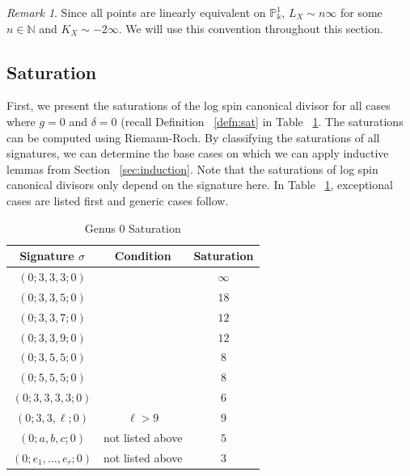 \documentclass{amsart}
\theoremstyle{plain}
\theoremstyle{definition}
\theoremstyle{remark}
\newtheorem{rem}[thm]{Remark}
\numberwithin{equation}{section}
\newcommand\ssec{\subsection}
\newcommand\BN{{\mathbb N}}
\newcommand\BP{{\mathbb P}}
\newcommand\Bk{{\Bbbk}}
\newcommand{\halfcan}{L}
\begin{document}
\begin{rem}
Since all points are linearly equivalent on $\BP^1_\Bk$, 
$\halfcan_X \sim n \infty$ for some $n \in \BN$ and
$K_X \sim -2 \infty$. We will use this convention
throughout this section.
\end{rem}

\ssec{Saturation}
\label{ssec:g-0-saturation}
First, we present the saturations of the log spin canonical divisor
for all cases where $g = 0$ and $\delta = 0$ (recall Definition
~\ref{defn:sat} in Table ~\ref{table:g-0-sat}. The saturations can
be computed using Riemann-Roch. By classifying the saturations of
all signatures, we can determine the base cases on which we can
apply inductive lemmas from Section ~\ref{sec:induction}. Note that
the saturations of log spin canonical divisors only depend on the
signature here. In Table ~\ref{table:g-0-sat}, exceptional cases
are listed first and generic cases follow.

\begin{table}
\begin{tabular}
	{| c | c || c |}
	\hline
	Signature $\sigma$ & Condition & Saturation \\
	\hline
	\hline

	$(0; 3, 3, 3; 0)$ & & $\infty$ \\	\hline

	$(0; 3, 3, 5; 0)$ & & $18$ \\	\hline
	
	$(0; 3, 3, 7; 0)$ & & $12$ \\	\hline
	
	$(0; 3, 3, 9; 0)$ & & $12$ \\	\hline
	
	$(0; 3, 5, 5; 0)$ & & $8$ \\	\hline
	
	$(0; 5, 5, 5; 0)$ & & $8$ \\	\hline
	
	$(0; 3, 3, 3, 3; 0)$ & & $6$ \\	\hline
	
	\hline
	\hline
	
	$(0; 3, 3, \ell; 0)$ & $\ell > 9$ & $9$ \\	\hline
	
	$(0; a, b, c; 0)$ & not listed above & $5$ \\	\hline
	
	$(0; e_1, \ldots, e_r; 0)$ & not listed above & $3$ \\	\hline
\end{tabular}

\caption{Genus 0 Saturation}
\label{table:g-0-sat}
\end{table}
\end{document}
